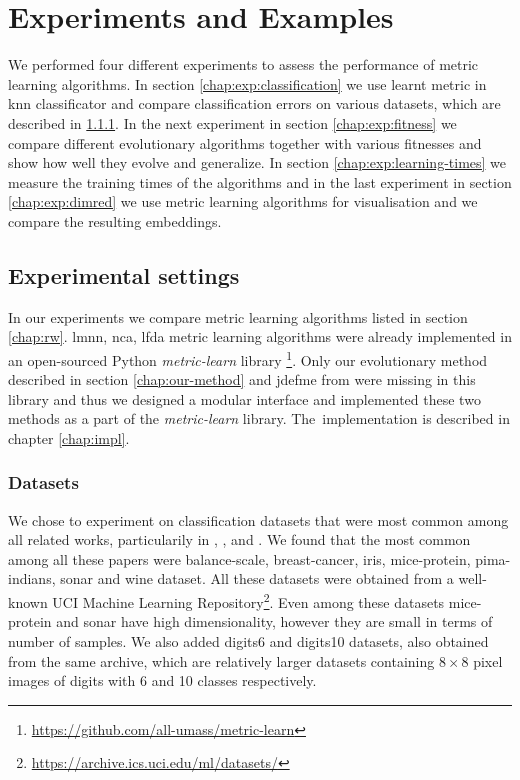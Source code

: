 \documentclass[12pt,a4paper]{report}
\begin{document}
\chapter{Experiments and Examples}
We performed four different experiments to assess the performance of metric learning algorithms. In section \ref{chap:exp:classification} we use learnt metric in \ac{knn} classificator and compare classification errors on various datasets, which are described in \ref{chap:exp:datasets}. In the next experiment in section \ref{chap:exp:fitness} we compare different evolutionary algorithms together with various fitnesses and show how well they evolve and generalize. In section \ref{chap:exp:learning-times} we measure the training times of the algorithms and in the last experiment in section \ref{chap:exp:dimred} we use metric learning algorithms for visualisation and we compare the resulting embeddings.

\section{Experimental settings} 
In our experiments we compare metric learning algorithms listed in section \ref{chap:rw}. \ac{lmnn}, \ac{nca}, \ac{lfda} metric learning algorithms were already implemented in an open-sourced Python \textit{metric-learn} library \footnote{\url{https://github.com/all-umass/metric-learn}}. Only our evolutionary method described in section \ref{chap:our-method} and \ac{jdefme} from  \cite{fukui2013evolutionary} were missing in this library and thus we designed a modular interface and implemented these two methods as a part of the \textit{metric-learn} library. The~implementation is described in chapter \ref{chap:impl}.

\subsection{Datasets} \label{chap:exp:datasets}
We chose to experiment on classification datasets that were most common among all related works, particularily in \cite{xing2002distance}, \cite{weinberger2009distance}, \cite{jacobgoldberger2004neighbourhood} and \cite{fukui2013evolutionary}. We found that the most common among all these papers were balance-scale, breast-cancer, iris, mice-protein, pima-indians, sonar and wine dataset. All these datasets were obtained from a well-known UCI Machine Learning Repository\footnote{\url{https://archive.ics.uci.edu/ml/datasets/}}. Even among these datasets mice-protein and sonar  have high dimensionality, however they are small in terms of number of samples. We also added digits6 and digits10 datasets, also obtained from the same archive, which are relatively larger datasets containing $8\times 8$ pixel images of digits with 6 and 10 classes respectively.
\end{document}
